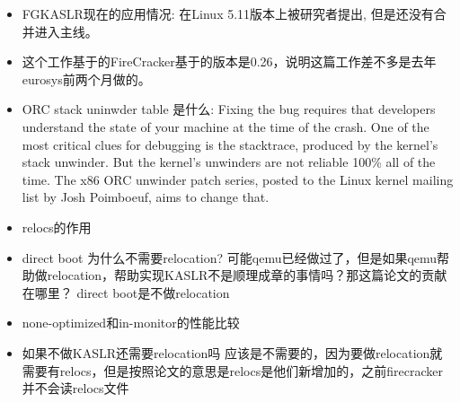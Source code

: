 \documentclass[
    aspectratio=169,  %
]{ctexbeamer}
\begin{document}
\begin{frame}
\begin{itemize}
  \item FGKASLR现在的应用情况: 在Linux 5.11版本上被研究者提出, 但是还没有合并进入主线。
  \item 这个工作基于的FireCracker基于的版本是0.26，说明这篇工作差不多是去年eurosys前两个月做的。
  \item ORC stack uninwder table 是什么: Fixing the bug requires that developers understand the state of your machine at the time of the crash. One of the most critical clues for debugging is the stacktrace, produced by the kernel’s stack unwinder. But the kernel’s unwinders are not reliable 100\% all of the time. The x86 ORC unwinder patch series, posted to the Linux kernel mailing list by Josh Poimboeuf, aims to change that.
  \item relocs的作用
  \item direct boot 为什么不需要relocation? 可能qemu已经做过了，但是如果qemu帮助做relocation，帮助实现KASLR不是顺理成章的事情吗？那这篇论文的贡献在哪里？ direct boot是不做relocation
  \item none-optimized和in-monitor的性能比较
  \item 如果不做KASLR还需要relocation吗 应该是不需要的，因为要做relocation就需要有relocs，但是按照论文的意思是relocs是他们新增加的，之前firecracker并不会读relocs文件
\end{itemize}
\end{frame}

\makebottom       %
\end{document}
